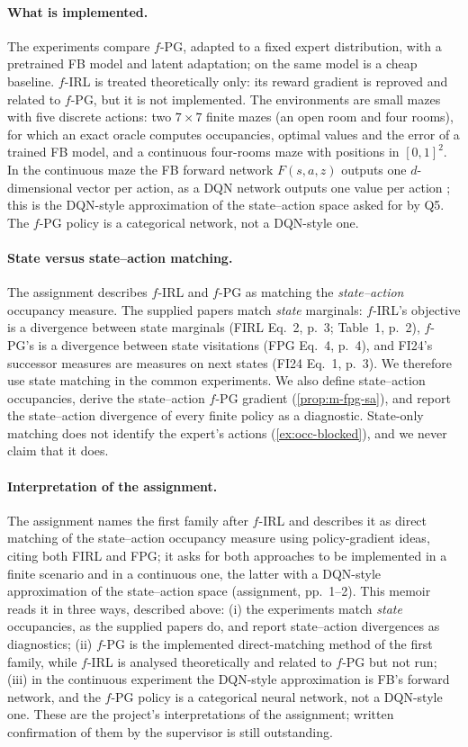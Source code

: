 \paragraph{What is implemented.}
The experiments compare $f$-PG, adapted to a fixed expert distribution, with a pretrained FB model and \DMFB{} latent adaptation; \ERFB{} on the same model is a cheap baseline.
$f$-IRL is treated theoretically only: its reward gradient is reproved and related to $f$-PG, but it is not implemented.
The environments are small mazes with five discrete actions: two $7\times7$ finite mazes (an open room and four rooms), for which an exact oracle computes occupancies, optimal values and the error of a trained FB model, and a continuous four-rooms maze with positions in $[0,1]^2$.
In the continuous maze the FB forward network $F(s,a,z)$ outputs one $d$-dimensional vector per action, as a DQN network outputs one value per action \citep{mnih2015dqn}; this is the DQN-style approximation of the state--action space asked for by Q5. The $f$-PG policy is a categorical network, not a DQN-style one.

\paragraph{State versus state--action matching.}
The assignment describes $f$-IRL and $f$-PG as matching the \emph{state--action} occupancy measure. The supplied papers match \emph{state} marginals: $f$-IRL's objective is a divergence between state marginals (FIRL Eq.~2, p.~3; Table~1, p.~2), $f$-PG's is a divergence between state visitations (FPG Eq.~4, p.~4), and FI24's successor measures are measures on next states (FI24 Eq.~1, p.~3).
We therefore use state matching in the common experiments.
We also define state--action occupancies, derive the state--action $f$-PG gradient (\cref{prop:m-fpg-sa}), and report the state--action divergence of every finite policy as a diagnostic.
State-only matching does not identify the expert's actions (\cref{ex:occ-blocked}), and we never claim that it does.

\paragraph{Interpretation of the assignment.}
The assignment names the first family after $f$-IRL and describes it as direct matching of the state--action occupancy measure using policy-gradient ideas, citing both FIRL and FPG; it asks for both approaches to be implemented in a finite scenario and in a continuous one, the latter with a DQN-style approximation of the state--action space (assignment, pp.~1--2).
This memoir reads it in three ways, described above: (i) the experiments match \emph{state} occupancies, as the supplied papers do, and report state--action divergences as diagnostics; (ii) $f$-PG is the implemented direct-matching method of the first family, while $f$-IRL is analysed theoretically and related to $f$-PG but not run; (iii) in the continuous experiment the DQN-style approximation is FB's forward network, and the $f$-PG policy is a categorical neural network, not a DQN-style one.
These are the project's interpretations of the assignment; written confirmation of them by the supervisor is still outstanding.

